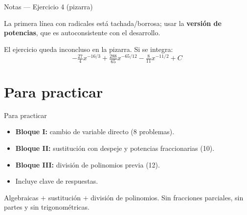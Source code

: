 \documentclass[aspectratio=169]{beamer}
\begin{document}
\begin{frame}{Notas — Ejercicio 4 (pizarra)}
  \begin{mwextra}
    La primera línea con radicales está tachada/borrosa; usar la
    \textbf{versión de potencias}, que es autoconsistente con el desarrollo.
  \end{mwextra}
  \vspace{3pt}
  \begin{mwextra}
    El ejercicio queda inconcluso en la pizarra. Si se integra:
    \[
      -\tfrac{27}{4}x^{-16/3}+\tfrac{288}{65}x^{-65/12}-\tfrac{8}{11}x^{-11/2}+C
    \]
  \end{mwextra}
\end{frame}

\section{Para practicar}

\begin{frame}{Para practicar}
  \begin{mwpasos}
    \begin{itemize}
      \item \textbf{Bloque I:} cambio de variable directo (8 problemas).
      \item \textbf{Bloque II:} sustitución con despeje y potencias fraccionarias (10).
      \item \textbf{Bloque III:} división de polinomios previa (12).
      \item Incluye clave de respuestas.
    \end{itemize}
  \end{mwpasos}
  \vspace{2pt}
  \begin{mwextra}
    Algebraicas $+$ sustitución $+$ división de polinomios. Sin fracciones
    parciales, sin partes y sin trigonométricas.
  \end{mwextra}
\end{frame}
\end{document}
